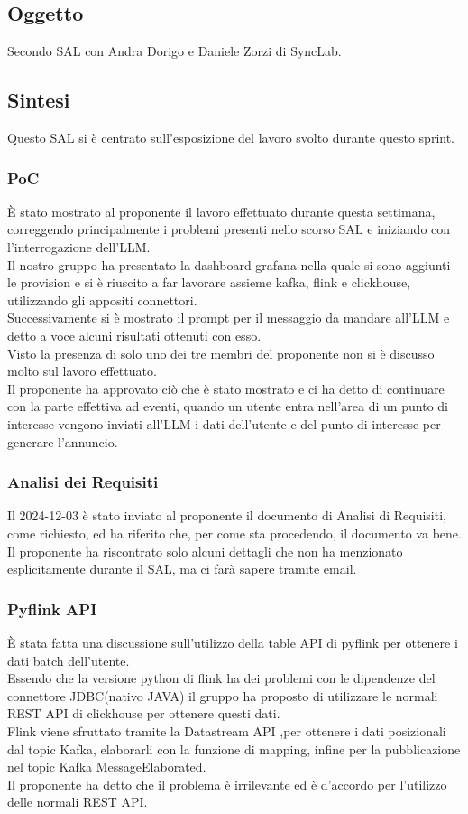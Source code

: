 \documentclass[12pt]{article}
\begin{document}
\subsection{Oggetto}
Secondo SAL con Andra Dorigo e Daniele Zorzi di SyncLab.

\subsection{Sintesi}
Questo SAL si è centrato sull'esposizione del lavoro svolto durante questo sprint.
\subsubsection{PoC}
\`E stato mostrato al proponente il lavoro effettuato durante questa settimana, correggendo principalmente i problemi presenti nello scorso SAL e iniziando con l'interrogazione dell'LLM. \\
Il nostro gruppo ha presentato la dashboard grafana nella quale si sono aggiunti le provision e si è riuscito a far lavorare assieme kafka, flink e clickhouse, utilizzando gli appositi connettori.\\
Successivamente si è mostrato il prompt per il messaggio da mandare all'LLM e detto a voce alcuni risultati ottenuti con esso.\\
Visto la presenza di solo uno dei tre membri del proponente non si è discusso molto sul lavoro effettuato.\\
Il proponente ha approvato ciò che è stato mostrato e ci ha detto di continuare con la parte effettiva ad eventi, quando un utente entra nell'area di un punto di interesse vengono inviati all'LLM i dati dell'utente e del punto di interesse per generare l'annuncio.

\subsubsection{Analisi dei Requisiti}
Il 2024-12-03 è stato inviato al proponente il documento di Analisi di Requisiti, come richiesto, ed ha riferito che, per come sta procedendo, il documento va bene.\\
Il proponente ha riscontrato solo alcuni dettagli che non ha menzionato esplicitamente durante il SAL, ma ci farà sapere tramite email.

\subsubsection{Pyflink API}
\`E stata fatta una discussione sull'utilizzo della table API di pyflink per ottenere i dati batch dell'utente.\\
Essendo che la versione python di flink ha dei problemi con le dipendenze del connettore JDBC(nativo JAVA) il gruppo ha proposto di utilizzare le normali REST API di clickhouse per ottenere questi dati.\\
Flink viene sfruttato tramite la Datastream API ,per ottenere i dati posizionali dal topic Kafka, elaborarli con la funzione di mapping, infine per la pubblicazione nel topic Kafka MessageElaborated.\\
Il proponente ha detto che il problema è irrilevante ed è d'accordo per l'utilizzo delle normali REST API.
\end{document}
